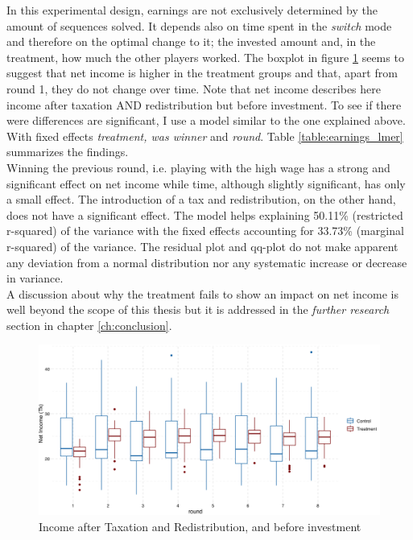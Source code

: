 In this experimental design, earnings are not exclusively determined by the amount of sequences solved. It depends also on time spent in the \textit{switch} mode and therefore on the optimal change to it; the invested amount and, in the treatment, how much the other players worked. The boxplot in figure \ref{fig:earnings_boxplot} seems to suggest that net income is higher in the treatment groups and that, apart from round 1, they do not change over time. Note that net income describes here income after taxation AND redistribution but before investment. To see if there were differences are significant, I use a model similar to the one explained above. With fixed effects \textit{treatment, was winner} and \textit{round}. Table \ref{table:earnings_lmer} summarizes the findings.\\

Winning the previous round, i.e. playing with the high wage has a strong and significant effect on net income while time, although slightly significant, has only a small effect. The introduction of a tax and redistribution, on the other hand, does not have a significant effect. The model helps explaining 50.11\% (restricted r-squared) of the variance with the fixed effects accounting for 33.73\% (marginal r-squared) of the variance. The residual plot and qq-plot do not make apparent any deviation from a normal distribution nor any systematic increase or decrease in variance.\\

A discussion about why the treatment fails to show an impact on net income is well beyond the scope of this thesis but it is addressed in the \textit{further research} section in chapter \ref{ch:conclusion}.


\begin{figure}
    \centering
    \includegraphics[width=\textwidth]{graphs/earnings_boxplot.png}
    \caption{Income after Taxation and Redistribution, and before investment}
    \label{fig:earnings_boxplot}
\end{figure}


